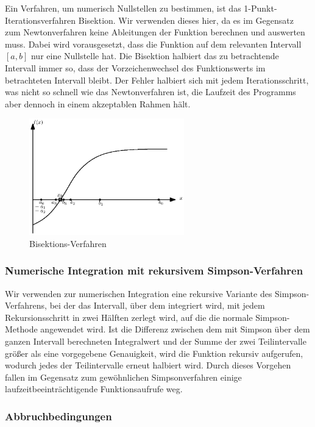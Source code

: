 \documentclass[10pt,a4paper]{article}
\begin{document}
Ein Verfahren, um numerisch Nullstellen zu bestimmen, ist das 1-Punkt-Iterationsverfahren Bisektion. Wir verwenden dieses hier, da es im Gegensatz zum Newtonverfahren keine Ableitungen der Funktion berechnen und auswerten muss. Dabei wird vorausgesetzt, dass die Funktion auf dem relevanten Intervall $[a,b]$ nur eine Nullstelle hat. Die Bisektion halbiert das zu betrachtende Intervall immer so, dass der Vorzeichenwechsel des Funktionswerts im betrachteten Intervall bleibt. Der Fehler halbiert sich mit jedem Iterationsschritt, was nicht so schnell wie das Newtonverfahren ist, die Laufzeit des Programms aber dennoch in einem akzeptablen Rahmen hält.
\begin{figure}[htbp]
\centering
\includegraphics[width=0.6\textwidth]{./figures/bisektion.eps}
\caption{Bisektions-Verfahren}
\label{fig:bisektion}
\end{figure}

\subsubsection{Numerische Integration mit rekursivem Simpson-Verfahren}

Wir verwenden zur numerischen Integration eine rekursive Variante des Simpson-Verfahrens, bei der das Intervall, über dem integriert wird, mit jedem Rekursionsschritt in zwei Hälften zerlegt wird, auf die die normale Simpson-Methode angewendet wird. Ist die Differenz zwischen dem mit Simpson über dem ganzen Intervall berechneten Integralwert und der Summe der zwei Teilintervalle größer als eine vorgegebene Genauigkeit, wird die Funktion rekursiv aufgerufen, wodurch jedes der Teilintervalle erneut halbiert wird. Durch dieses Vorgehen fallen im Gegensatz zum gewöhnlichen Simpsonverfahren einige laufzeitbeeinträchtigende Funktionsaufrufe weg.

\subsubsection{Abbruchbedingungen}
\end{document}
